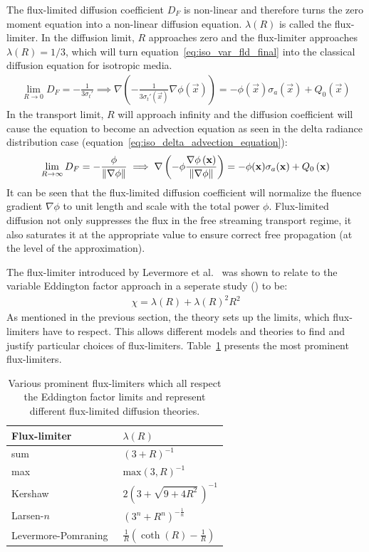 The flux-limited diffusion coefficient $D_F$ is non-linear and therefore turns the zero moment equation into a non-linear diffusion equation. $\lambda(R)$ is called the flux-limiter. In the diffusion limit, $R$ approaches zero and the flux-limiter approaches $\lambda(R)=1/3$, which will turn equation~\ref{eq:iso_var_fld_final} into the classical diffusion equation for isotropic media.
\begin{align}
\lim_{R\rightarrow 0 }D_F =-\frac{1}{3\sigma_t'}
\implies
\nabla
\left(
-\frac{1}{3\sigma_t'\left(\vec{x}\right)}
\nabla \phi\left(\vec{x}\right)
\right)
=
-\phi(\vec{x})\sigma_a(\vec{x})
+Q_0\left(\vec{x}\right)
\end{align}
In the transport limit, $R$ will approach infinity and the diffusion coefficient will cause the equation to become an advection equation as seen in the delta radiance distribution case (equation~\ref{eq:iso_delta_advection_equation}):
\begin{align}
\lim_{R\rightarrow\infty }D_F =-\frac{\phi}{\left\lVert\nabla\phi\right\rVert}
\implies
\nabla
\left(
-\phi\frac{\nabla\phi\left(\boldsymbol{\mathbf{x}}\right)}{\left\lVert\nabla\phi\right\rVert}
\right)
=
-\phi(\boldsymbol{\mathbf{x}})\sigma_a(\boldsymbol{\mathbf{x}})
+Q_0\left(\boldsymbol{\mathbf{x}}\right)
\end{align}
It can be seen that the flux-limited diffusion coefficient will normalize the fluence gradient $\nabla\phi$ to unit length and scale with the total power $\phi$. Flux-limited diffusion not only suppresses the flux in the free streaming transport regime, it also saturates it at the appropriate value to ensure correct free propagation (at the level of the approximation).

The flux-limiter introduced by Levermore et al.~\cite{Levermore81} was shown to relate to the variable Eddington factor approach in a seperate study (\cite{Whalen82, Levermore84}) to be:
\begin{align}
\label{eq:iso_var_fld_vef}
\chi = \lambda(R) + \lambda(R)^2R^2
\end{align}
As mentioned in the previous section, the theory sets up the limits, which flux-limiters have to respect. This allows different models and theories to find and justify particular choices of flux-limiters. Table~\ref{tbl:flux-limiters} presents the most prominent flux-limiters.
\begin{table}[h]
\center
\caption{Various prominent flux-limiters which all respect the Eddington factor limits and represent different flux-limited diffusion theories.}
\begin{tabular}{ l l }
\hline\hline
 Flux-limiter & $\lambda\left(R\right)$ \\ 
\hline
 sum~\cite{Bowers82} & $(3+R)^{-1}$ \\
 max~\cite{Bowers82} & $\mbox{max}(3, R)^{-1}$ \\
 Kershaw~\cite{Kershaw76} & $2(3+\sqrt{9 + 4R^2}\,)^{-1}$ \\
 Larsen-$n$~\cite{Larsen74} & $(3^n + R^n)^{-\frac{1}{n}}$ \\
 Levermore-Pomraning~\cite{Levermore81} & $\frac{1}{R} \left(\coth(R)-\frac{1}{R}\right)$    
\end{tabular}
\label{tbl:flux-limiters}
\end{table}


